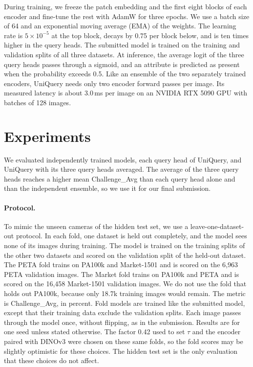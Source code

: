 \documentclass[10pt,twocolumn,letterpaper]{article}
\begin{document}
During training, we freeze the patch embedding and the first eight blocks of each encoder and fine-tune the rest with AdamW for three epochs. We use a batch size of 64 and an exponential moving average (EMA) of the weights. The learning rate is $5\times10^{-5}$ at the top block, decays by 0.75 per block below, and is ten times higher in the query heads. The submitted model is trained on the training and validation splits of all three datasets. At inference, the average logit of the three query heads passes through a sigmoid, and an attribute is predicted as present when the probability exceeds 0.5. Like an ensemble of the two separately trained encoders, UniQuery needs only two encoder forward passes per image. Its measured latency is about 3.0\,ms per image on an NVIDIA RTX 5090 GPU with batches of 128 images.

\section{Experiments}
\label{sec:exp}

We evaluated independently trained models, each query head of UniQuery, and UniQuery with its three query heads averaged. The average of the three query heads reaches a higher mean Challenge\_Avg than each query head alone and than the independent ensemble, so we use it for our final submission.

\paragraph{Protocol.} To mimic the unseen cameras of the hidden test set, we use a leave-one-dataset-out protocol. In each fold, one dataset is held out completely, and the model sees none of its images during training. The model is trained on the training splits of the other two datasets and scored on the validation split of the held-out dataset. The PETA fold trains on PA100k and Market-1501 and is scored on the 6,963 PETA validation images. The Market fold trains on PA100k and PETA and is scored on the 16,458 Market-1501 validation images. We do not use the fold that holds out PA100k, because only 18.7k training images would remain. The metric is Challenge\_Avg, in percent. Fold models are trained like the submitted model, except that their training data exclude the validation splits. Each image passes through the model once, without flipping, as in the submission. Results are for one seed unless stated otherwise. The factor 0.42 used to set $\tau$ and the encoder paired with DINOv3 were chosen on these same folds, so the fold scores may be slightly optimistic for these choices. The hidden test set is the only evaluation that these choices do not affect.
\end{document}
